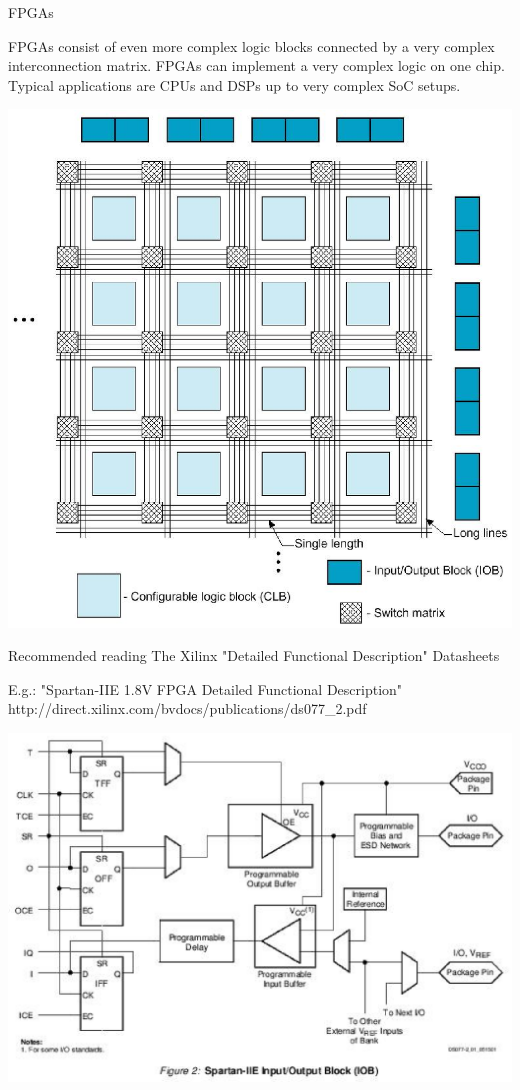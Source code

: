 \documentclass[pdf]{prosper}
\begin{document}
\begin{slide}{FPGAs}

FPGAs consist of even more complex logic blocks connected by a very
complex interconnection matrix. FPGAs can implement a very complex logic
on one chip. Typical applications are CPUs and DSPs up to very complex
SoC setups.

\includegraphics[scale=.40]{fpga.eps}

\end{slide}

\begin{slide}{Recommended reading}
The Xilinx "Detailed Functional Description" Datasheets \\
\vspace*{.5cm}

E.g.: "Spartan-IIE 1.8V FPGA Detailed Functional Description" \\
http://direct.xilinx.com/bvdocs/publications/ds077\_2.pdf

\includegraphics[scale=.50]{xliob.eps}

\end{slide}
\end{document}
